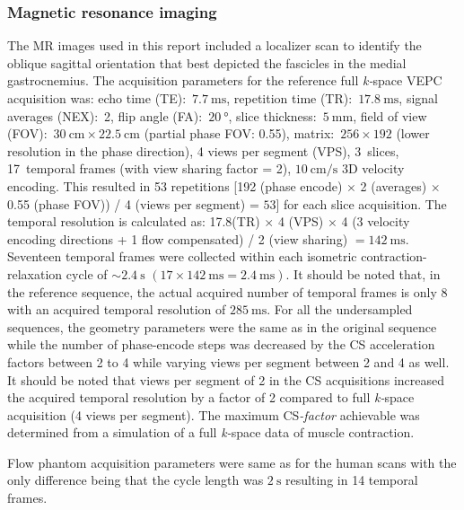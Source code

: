 \subsubsection{Magnetic resonance imaging}
The MR images used in this report included a localizer scan to identify the oblique sagittal orientation that best depicted the fascicles in the medial gastrocnemius. 
The acquisition parameters for the reference full \mbox{\textit{k-}space} VEPC acquisition was: echo time (TE):~$\SI{7.7}{\milli\second}$, repetition time (TR):~$\SI{17.8}{\milli\second}$, signal averages (NEX):~2, flip angle (FA):~$\SI{20}{\degree}$, slice thickness:~$\SI{5}{\milli\meter}$, field of view (FOV):~$\SI{30}{\centi\meter} \times \SI{22.5}{\centi\meter}$ (partial phase FOV: 0.55), matrix:~$256 \times 192$ (lower resolution in the phase direction), 4 views per segment (VPS), 3~slices, 17~temporal frames (with view sharing factor = 2), $\SI{10}{\centi\meter/\second}$ 3D velocity encoding. 
This resulted in 53 repetitions [192 (phase encode) $\times$ 2 (averages) $\times$ 0.55 (phase FOV)) / 4 (views per segment) = $53$] for each slice acquisition. 
The temporal resolution is calculated as: 17.8(TR) $\times$ 4 (VPS) $\times$ 4 (3 velocity encoding directions + 1 flow compensated) / 2 (view sharing) $ = \SI{142}{\milli\second}$. 
Seventeen temporal frames were collected within each isometric contraction-relaxation cycle of $\sim \SI{2.4}{\second}$ $(17 \times \SI{142}{\milli\second}  = \SI{2.4}{\milli\second})$. 
It should be noted that, in the reference sequence, the actual acquired number of temporal frames is only 8 with an acquired temporal resolution of $\SI{285}{\milli\second}$. 
For all the undersampled sequences, the geometry parameters were the same as in the original sequence while the number of phase-encode steps was decreased by the CS acceleration factors between 2 to 4 while varying views per segment between 2 and 4 as well. 
It should be noted that views per segment of 2 in the CS acquisitions increased the acquired temporal resolution by a factor of 2 compared to full \mbox{\textit{k-}space} acquisition (4 views per segment). 
The maximum \mbox{CS\textit{-factor}} achievable was determined from a simulation of a full \mbox{\textit{k-}space} data of muscle contraction. 

Flow phantom acquisition parameters were same as for the human scans with the only difference being that the cycle length was $\SI{2}{\second}$ resulting in 14 temporal frames.
